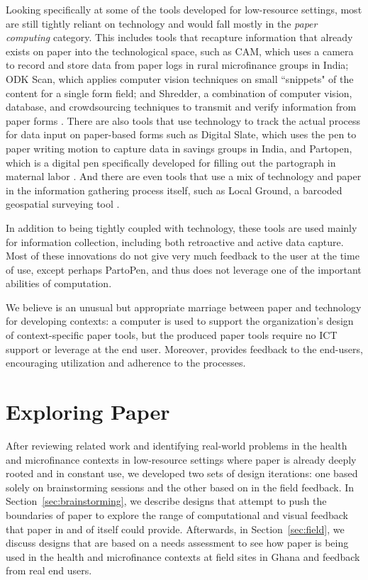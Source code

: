 \documentclass{sig-alternate}
\begin{document}
Looking specifically at some of the tools developed for low-resource settings, most are still tightly reliant on technology and would fall mostly in the \emph{paper computing} category. This includes tools that recapture information that already exists on paper into the technological space, such as CAM, which uses a camera to record and store data from paper logs in rural microfinance groups in India; ODK Scan, which applies computer vision techniques on small ``snippets" of the content for a single form field; and Shredder, a combination of computer vision, database, and crowdsourcing techniques to transmit and verify information from paper forms \cite{parikh2006, akona2009, dell2012, dell2013, chen2012}. There are also tools that use technology to track the actual process for data input on paper-based forms such as Digital Slate, which uses the pen to paper writing motion to capture data in savings groups in India, and Partopen, which is a digital pen specifically developed for filling out the partograph in maternal labor \cite{ratan2010, underwood2012, underwood2013}. And there are even tools that use a mix of technology and paper in the information gathering process itself, such as Local Ground, a barcoded geospatial surveying tool \cite{wart2010}.

In addition to being tightly coupled with technology, these tools are used mainly for information collection, including both retroactive and active data capture. Most of these innovations do not give very much feedback to the user at the time of use, except perhaps PartoPen, and thus does not leverage one of the important abilities of computation.

We believe \nifty is an unusual but appropriate marriage between paper and technology for developing contexts: a computer is used to support the organization's design of context-specific paper tools, but the produced paper tools require no ICT support or leverage at the end user. Moreover, \nifty provides feedback to the end-users, encouraging utilization and adherence to the processes.


\section{Exploring Paper}
\label{sec:exploring-paper}

After reviewing related work and identifying real-world problems in the health and microfinance contexts in low-resource settings where paper is already deeply rooted and in constant use, we developed two sets of design iterations: one based solely on brainstorming sessions and the other based on in the field feedback. In Section~\ref{sec:brainstorming}, we describe designs that attempt to push the boundaries of paper to explore the range of computational and visual feedback that paper in and of itself could provide. Afterwards, in Section~\ref{sec:field}, we discuss designs that are based on a needs assessment to see how paper is being used in the health and microfinance contexts at field sites in Ghana and feedback from real end users.
\end{document}
